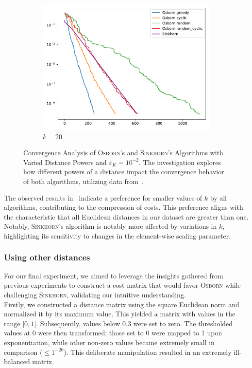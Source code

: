 \begin{figure}[H]
\begin{subfigure}[b]{.18\textwidth}
        \centering
        \includegraphics[width=\textwidth]{figures/dist2_k/osborn_vs_sinkhorn_dist2_0.01_1e-10_2_10}
        \caption{\(k = 20\)}
    \end{subfigure}
    \caption{Convergence Analysis of \textsc{Osborn}'s and \textsc{Sinkhorn}'s Algorithms with Varied Distance Powers and \(\varepsilon_K = 10^{-2}\). The investigation explores how different powers of a distance impact the convergence behavior of both algorithms, utilizing data from~.}\label{k}
\end{figure}

The observed results in~ indicate a preference for smaller values of \(k\) by all algorithms, contributing to the compression of costs. This preference aligns with the characteristic that all Euclidean distances in our dataset are greater than one. Notably, \textsc{Sinkhorn}'s algorithm is notably more affected by variations in \(k\), highlighting its sensitivity to changes in the element-wise scaling parameter. 

\subsubsection{Using other distances} 

For our final experiment, we aimed to leverage the insights gathered from previous experiments to construct a cost matrix that would favor \textsc{Osborn} while challenging \textsc{Sinkhorn}, validating our intuitive understanding.\\

Firstly, we constructed a distance matrix using the square Euclidean norm and normalized it by its maximum value. This yielded a matrix with values in the range \(]0,1]\). Subsequently, values below \(0.3\) were set to zero. The thresholded values at 0 were then transformed: those set to 0 were mapped to 1 upon exponentiation, while other non-zero values became extremely small in comparison (\(\leq 1^{-20}\)). This deliberate manipulation resulted in an extremely ill-balanced matrix.

